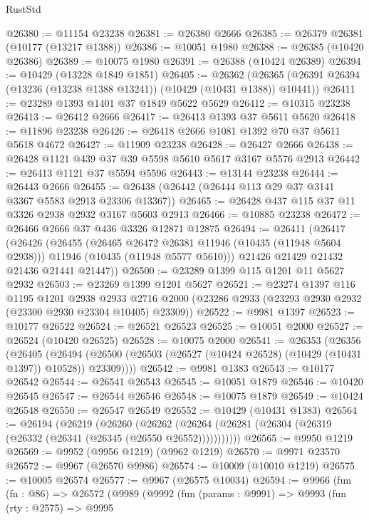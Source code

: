 \begin{lexlean}{RustStd}
\begin{coremodule}
@26380 := @11154 @23238
@26381 := @26380 @2666
@26385 := @26379 @26381 (@10177 (@13217 @1388))
@26386 := @10051 @1980
@26388 := @26385 (@10420 @26386)
@26389 := @10075 @1980
@26391 := @26388 (@10424 @26389)
@26394 := @10429 (@13228 @1849 @1851)
@26405 := @26362
    (@26365 (@26391 @26394 (@13236 (@13238 @1388 @13241)) (@10429 (@10431 @1388)) @10441))
@26411 := @23289 @1393 @1401 @37 @1849 @5622 @5629
@26412 := @10315 @23238
@26413 := @26412 @2666
@26417 := @26413 @1393 @37 @5611 @5620
@26418 := @11896 @23238
@26426 := @26418 @2666 @1081 @1392 @70 @37 @5611 @5618 @4672
@26427 := @11909 @23238
@26428 := @26427 @2666
@26438 := @26428 @1121 @439 @37 @39 @5598 @5610 @5617 @3167 @5576 @2913
@26442 := @26413 @1121 @37 @5594 @5596
@26443 := @13144 @23238
@26444 := @26443 @2666
@26455 := @26438 (@26442 (@26444 @113 @29 @37 @3141 @3367 @5583 @2913 @23306 @13367))
@26465 := @26428 @437 @115 @37 @11 @3326 @2938 @2932 @3167 @5603 @2913
@26466 := @10885 @23238
@26472 := @26466 @2666 @37 @436 @3326 @12871 @12875
@26494 := @26411
    (@26417
      (@26426
        (@26455
          (@26465 @26472 @26381 @11946 (@10435 (@11948 @5604 @2938)))
          @11946
          (@10435 (@11948 @5577 @5610)))
        @21426
        @21429
        @21432
        @21436
        @21441
        @21447))
@26500 := @23289 @1399 @115 @1201 @11 @5627 @2932
@26503 := @23269 @1399 @1201 @5627
@26521 := @23274
    @1397
    @116
    @1195
    @1201
    @2938
    @2933
    @2716
    @2000
    (@23286 @2933 (@23293 @2930 @2932 (@23300 @2930 @23304 @10405) @23309))
@26522 := @9981 @1397
@26523 := @10177 @26522
@26524 := @26521 @26523
@26525 := @10051 @2000
@26527 := @26524 (@10420 @26525)
@26528 := @10075 @2000
@26541 := @26353
    (@26356
      (@26405
        (@26494 (@26500 (@26503 (@26527 (@10424 @26528) (@10429 (@10431 @1397)) @10528)) @23309))))
@26542 := @9981 @1383
@26543 := @10177 @26542
@26544 := @26541 @26543
@26545 := @10051 @1879
@26546 := @10420 @26545
@26547 := @26544 @26546
@26548 := @10075 @1879
@26549 := @10424 @26548
@26550 := @26547 @26549
@26552 := @10429 (@10431 @1383)
@26564 := @26194
    (@26219
      (@26260
        (@26262 (@26264 (@26281 (@26304 (@26319 (@26332 (@26341 (@26345 (@26550 @26552)))))))))))
@26565 := @9950 @1219
@26569 := @9952 (@9956 @1219) (@9962 @1219)
@26570 := @9971 @23570
@26572 := @9967 (@26570 @9986)
@26574 := @10009 (@10010 @1219)
@26575 := @10005 @26574
@26577 := @9967 (@26575 @10034)
@26594 := @9966
    (fun (fn : @86) =>
    @26572
      (@9989
        (@9992
          (fun (params : @9991) =>
          @9993
            (fun (rty : @2575) =>
            @9995

\end{coremodule}
\end{lexlean}
